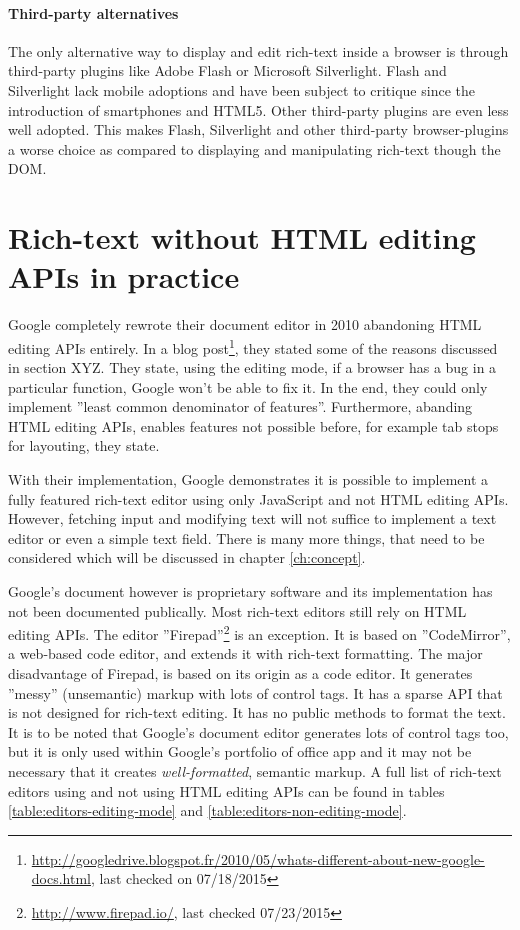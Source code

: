 \paragraph{Third-party alternatives} The only alternative way to display and edit rich-text inside a browser is through third-party plugins like Adobe Flash or Microsoft Silverlight. Flash and Silverlight lack mobile adoptions and have been subject to critique since the introduction of smartphones and HTML5. Other third-party plugins are even less well adopted. This makes Flash, Silverlight and other third-party browser-plugins a worse choice as compared to displaying and manipulating rich-text though the DOM.

\section{Rich-text without HTML editing APIs in practice} Google completely rewrote their document editor in 2010 abandoning HTML editing APIs entirely. In a blog post\footnote{\url{http://googledrive.blogspot.fr/2010/05/whats-different-about-new-google-docs.html}, last checked on 07/18/2015}, they stated some of the reasons discussed in section XYZ. They state, using the editing mode, if a browser has a bug in a particular function, Google won't be able to fix it. In the end, they could only implement ''least common denominator of features''. Furthermore, abanding HTML editing APIs, enables features not possible before, for example tab stops for layouting, they state. 

With their implementation, Google demonstrates it is possible to implement a fully featured rich-text editor using only JavaScript and not HTML editing APIs. However, fetching input and modifying text will not suffice to implement a text editor or even a simple text field. There is many more things, that need to be considered which will be discussed in chapter \ref{ch:concept}. %



Google's document however is proprietary software and its implementation has not been documented publically. Most rich-text editors still rely on HTML editing APIs. The editor ''Firepad''\footnote{\url{http://www.firepad.io/}, last checked 07/23/2015} is an exception. It is based on ''CodeMirror'', a web-based code editor, and extends it with rich-text formatting. The major disadvantage of Firepad, is based on its origin as a code editor. It generates ''messy'' (unsemantic) markup with lots of control tags. It has a sparse API that is not designed for rich-text editing. It has no public methods to format the text. It is to be noted that Google's document editor generates lots of control tags too, but it is only used within Google's portfolio of office app and it may not be necessary that it creates \textit{well-formatted}, semantic markup. A full list of rich-text editors using and not using HTML editing APIs can be found in tables \ref{table:editors-editing-mode} and \ref{table:editors-non-editing-mode}.


